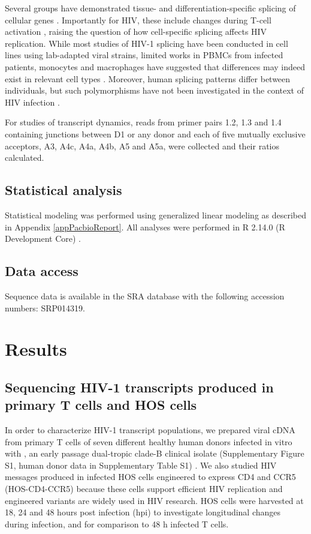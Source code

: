 \documentclass[../sherrill-Mix_thesis.tex]{subfiles}
\begin{document}

Several groups have demonstrated tissue- and differentiation-specific splicing of cellular genes \citep{Wang2008,Grabowski2011,Llorian2011}. Importantly for HIV, these include changes during T-cell activation \citep{Ip2007,Topp2008}, raising the question of how cell-specific splicing affects HIV replication. While most studies of HIV-1 splicing have been conducted in cell lines using lab-adapted viral strains, limited works in PBMCs from infected patients, monocytes and macrophages have suggested that differences may indeed exist in relevant cell types \citep{Carrera2010,Saltarelli1996,Sonza2002,Dowling2008}. Moreover, human splicing patterns differ between individuals, but such polymorphisms have not been investigated in the context of HIV infection \citep{Hull2007,Kwan2007}.

For studies of transcript dynamics, reads from primer pairs 1.2, 1.3 and 1.4 containing junctions between D1 or any donor and each of five mutually exclusive acceptors, A3, A4c, A4a, A4b, A5 and A5a, were collected and their ratios calculated. 

\subsection{Statistical analysis}
Statistical modeling was performed using generalized linear modeling as described in Appendix \ref{appPacbioReport}. All analyses were performed in R 2.14.0 (R Development Core) \citep{RCoreTeam2012}. 

\subsection{Data access}
Sequence data is available in the SRA database with the following accession numbers: SRP014319.

\section{Results}
\subsection{Sequencing HIV-1 transcripts produced in primary T cells and HOS cells}
In order to characterize HIV-1 transcript populations, we prepared viral cDNA from primary \cdFour{} T cells of seven different healthy human donors infected in vitro with \hivEight{}, an early passage dual-tropic clade-B clinical isolate (Supplementary Figure S1, human donor data in Supplementary Table S1) \citep{Collman1992}. We also studied HIV messages produced in infected HOS cells engineered to express CD4 and CCR5 (HOS-CD4-CCR5) because these cells support efficient HIV replication and engineered variants are widely used in HIV research. HOS cells were harvested at 18, 24 and 48 hours post infection (hpi) to investigate longitudinal changes during infection, and for comparison to 48 h infected T cells.
\end{document}
